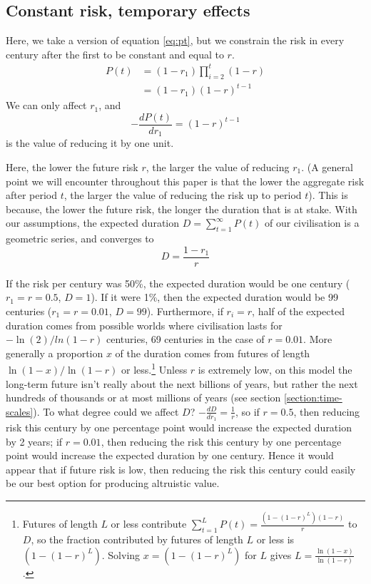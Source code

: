 \documentclass[british]{article}
\begin{document}
\subsection{Constant risk, temporary effects}\label{cr-te}


Here, we take a version of equation \ref{eq:pt}, but we constrain the risk in every century after the first to be constant and equal to $r$.
\begin{align*}
P(t) &= (1-r_1) \prod_{i=2}^{t}(1-r) \\
&= (1-r_1)(1-r)^{t-1}
\end{align*}
We can only affect $r_1$, and \[-\frac{dP(t)}{dr_1} = (1-r) ^{t-1}\] is the value of reducing it by one unit.

Here, the lower the future risk \(r\), the larger the value of reducing
\(r_1\). (A general point we will encounter throughout this paper is that the lower the aggregate risk after period $t$, the larger the value of reducing the risk up to period $t$). This is because, the lower the future risk, the longer the duration that is at stake. With our assumptions, the expected duration $D=\sum_{t=1}^\infty P(t)$ of our civilisation is a geometric series, and converges to $$D=\frac{1-r_1}{r}$$

If the risk per century was 50\%, the expected duration would be one century ($r_1=r=0.5$, $D=1$). If it were 1\%, then the expected duration would be 99 centuries ($r_1=r=0.01$, $D=99$). Furthermore, if $r_i=r$, half of the expected duration comes from possible worlds where civilisation lasts for $-\ln(2)/ln(1-r)$ centuries, 69 centuries in the case of $r=0.01$. More generally a proportion $x$ of the duration comes from futures of length $\ln(1-x)/\ln(1-r)$ or less.\footnote{Futures of length $L$ or less contribute $\sum_{t=1}^L P(t)=\frac{(1-(1-r)^L)(1-r)}{r}$ to $D$, so the fraction contributed by futures of length $L$ or less is $(1-(1-r)^L)$. Solving $x=(1-(1-r)^L)$ for $L$ gives $L=\frac{\ln(1-x)}{\ln(1-r)}$.} Unless $r$ is extremely low, on this model the long-term future isn't really about the next billions of years, but rather the next hundreds of thousands or at most millions of years (see section \ref{section:time-scales}). To what degree could we affect $D$? $-\frac{dD}{dr_1}=\frac{1}{r}$, so if $r=0.5$, then reducing risk this century by one percentage point would increase the expected duration by 2 years; if $r=0.01$, then reducing the risk this century by one percentage point would increase the expected duration by one century. Hence it would appear that if future risk is low, then reducing the risk this century could easily be our best option for producing altruistic value.
\end{document}
